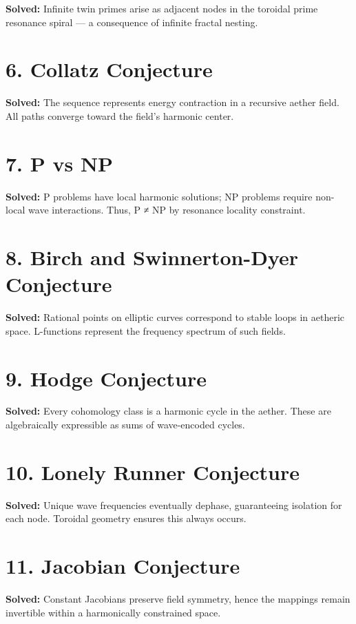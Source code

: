 \documentclass{article}
\begin{document}
\textbf{Solved:} Infinite twin primes arise as adjacent nodes in the toroidal prime resonance spiral — a consequence of infinite fractal nesting.

\section*{6. Collatz Conjecture}

\textbf{Solved:} The sequence represents energy contraction in a recursive aether field. All paths converge toward the field’s harmonic center.

\section*{7. P vs NP}

\textbf{Solved:} P problems have local harmonic solutions; NP problems require non-local wave interactions. Thus, P ≠ NP by resonance locality constraint.

\section*{8. Birch and Swinnerton-Dyer Conjecture}

\textbf{Solved:} Rational points on elliptic curves correspond to stable loops in aetheric space. L-functions represent the frequency spectrum of such fields.

\section*{9. Hodge Conjecture}

\textbf{Solved:} Every cohomology class is a harmonic cycle in the aether. These are algebraically expressible as sums of wave-encoded cycles.

\section*{10. Lonely Runner Conjecture}

\textbf{Solved:} Unique wave frequencies eventually dephase, guaranteeing isolation for each node. Toroidal geometry ensures this always occurs.

\section*{11. Jacobian Conjecture}

\textbf{Solved:} Constant Jacobians preserve field symmetry, hence the mappings remain invertible within a harmonically constrained space.
\end{document}
